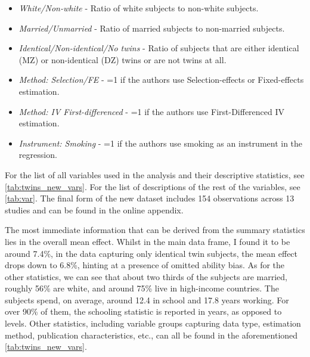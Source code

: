 \begin{itemize}
  \item \textit{White/Non-white} - Ratio of white subjects to non-white subjects.
  \item \textit{Married/Unmarried} - Ratio of married subjects to non-married subjects.
  \item \textit{Identical/Non-identical/No twins} - Ratio of subjects that are either identical (MZ) or non-identical (DZ) twins or are not twins at all.
  \item \textit{Method: Selection/FE} - =1 if the authors use  Selection-effects or Fixed-effects estimation.
  \item \textit{Method: IV First-differenced} - =1 if the authors use First-Differenced IV estimation.
  \item \textit{Instrument: Smoking} - =1 if the authors use smoking as an instrument in the regression.
\end{itemize}



For the list of all variables used in the analysis and their descriptive statistics, see \autoref{tab:twins_new_vars}. For the list of descriptions of the rest of the variables, see \autoref{tab:var}. The final form of the new dataset includes 154 observations across 13 studies and can be found in the online appendix.

The most immediate information that can be derived from the summary statistics lies in the overall mean effect. Whilst in the main data frame, I found it to be around 7.4\%, in the data capturing only identical twin subjects, the mean effect drops down to 6.8\%, hinting at a presence of omitted ability bias. As for the other statistics, we can see that about two thirds of the subjects are married, roughly 56\% are white, and around 75\% live in high-income countries. The subjects spend, on average, around 12.4 in school and 17.8 years working. For over 90\% of them, the schooling statistic is reported in years, as opposed to levels. Other statistics, including variable groups capturing data type, estimation method, publication characteristics, etc., can all be found in the aforementioned \autoref{tab:twins_new_vars}.

